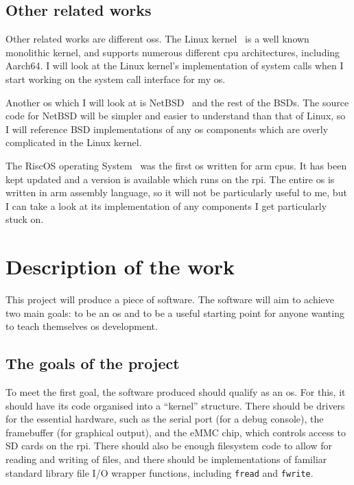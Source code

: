 \documentclass{article}
\begin{document}
\begin{refsection}
\subsection{Other related works}

Other related works are different \glspl{os}. The Linux
kernel~\cite{linux-kernel-git} is a well known monolithic kernel, and supports
numerous different \gls{cpu} architectures, including Aarch64. I will look at
the Linux kernel's implementation of system calls when I start working on the
system call interface for my \gls{os}.

Another \gls{os} which I will look at is NetBSD~\cite{netBSD-git} and the rest
of the BSDs. The source code for NetBSD will be simpler and easier to
understand than that of Linux, so I will reference BSD implementations of any
\gls{os} components which are overly complicated in the Linux kernel.

The RiscOS operating System~\cite{riscOS-source} was the first \gls{os} written
for \gls{arm} \glspl{cpu}. It has been kept updated and a version is available
which runs on the \gls{rpi}. The entire \gls{os} is written in \gls{arm}
assembly language, so it will not be particularly useful to me, but I can take
a look at its implementation of any components I get particularly stuck on.

\printbibliography[heading=relworks]

\end{refsection}

\section{Description of the work}
This project will produce a piece of software. The software will aim to achieve
two main goals: to be an \gls{os} and to be a useful starting point for anyone
wanting to teach themselves \gls{os} development.

\subsection{The goals of the project}
To meet the first goal, the software produced should qualify as an \gls{os}.
For this, it should have its code organised into a ``kernel'' structure. There
should be drivers for the essential hardware, such as the serial port (for a
debug console), the framebuffer (for graphical output), and the eMMC chip,
which controls access to SD cards on the \gls{rpi}. There should also be enough
filesystem code to allow for reading and writing of files, and there should be
implementations of familiar standard library file I/O wrapper functions,
including \texttt{fread} and \texttt{fwrite}.
\end{document}
